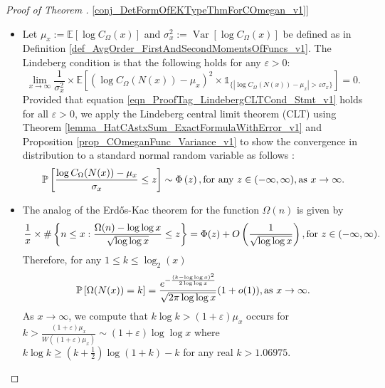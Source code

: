\documentclass[11pt,reqno,a4letter]{article}
\newcommand{\hlocalref}[1]{\hyperref[#1]{\ref{#1}}}
\numberwithin{equation}{section}
\numberwithin{figure}{section}
\numberwithin{table}{section}
\theoremstyle{plain}
\numberwithin{theorem}{section}
\theoremstyle{definition}
\theoremstyle{remark}
\newcommand{\mathtext}[1]{\text{\rm #1}}
\begin{document}
\begin{proof}[Proof of Theorem \hlocalref{conj_DetFormOfEKTypeThmForCOmegan_v1}]
\begin{itemize}
\[     \times \mathbb{P}\left[C_p^{(x)} \geq 2\right] = o\left(\mathbb{E}[\Theta_{N(x)}]\right). 
\]
Analogous bounds can be proved to relate the variance of these 
two random variables as $x \rightarrow \infty$. 
\item 
Let $\mu_x := \mathbb{E}\left[\log C_{\Omega}(x)\right]$ and 
$\sigma_x^2 := \operatorname{Var}\left[\log C_{\Omega}(x)\right]$ be defined as in 
Definition \hlocalref{def_AvgOrder_FirstAndSecondMomentsOfFuncs_v1}. 
The Lindeberg condition is that the following 
holds for any $\varepsilon > 0$: 
\begin{equation}
\label{eqn_ProofTag_LindebergCLTCond_Stmt_v1}
\lim_{x \rightarrow \infty} \frac{1}{\sigma_x^2} \times 
     \mathbb{E}\left[\left(\log C_{\Omega}(N(x)) - \mu_x\right)^2 
     \times 
     \mathds{1}_{\{\left\lvert \log C_{\Omega}(N(x)) - \mu_x \right\rvert > 
     \varepsilon \sigma_x\}}\right] = 0. 
\end{equation}
Provided that 
equation \eqref{eqn_ProofTag_LindebergCLTCond_Stmt_v1} holds for all $\varepsilon > 0$, 
we apply the Lindeberg central limit theorem (CLT) using 
Theorem \hlocalref{lemma_HatCAstxSum_ExactFormulaWithError_v1} and 
Proposition \hlocalref{prop_COmeganFunc_Variance_v1} to show the 
convergence in distribution to a standard normal random variable as follows 
\cite[\S 27]{BILLINGSLY-PROB-AND-MEASURE-BOOK}: 
\begin{equation}
\label{eqn_ProofTag_LindebergCLT_Conclusion_Stmt_v2}
\mathbb{P}\left[\frac{\log C_{\Omega}(N(x)) - \mu_x}{\sigma_x} \leq z\right] \sim 
	\Phi\left(z\right), \mathtext{ for any } z \in (-\infty, \infty), 
	\mathtext{ as } x \rightarrow \infty.
\end{equation}
\item 
The analog of the Erd\H{o}s-Kac theorem for the function $\Omega(n)$ is given by 
\cite[Thm.~7.21; \S 7.4]{MV} 
\[
\frac{1}{x} \times \#\left\{n \leq x: \frac{\Omega(n) - \log\log x}{\sqrt{\log\log x}} \leq z\right\} = 
     \Phi(z) + O\left(\frac{1}{\sqrt{\log\log x}}\right), \mathtext{ for } z \in (-\infty, \infty). 
\]
Therefore, for any $1 \leq k \leq \log_2(x)$ 
\[
\mathbb{P}\left[\Omega(N(x)) = k\right] = 
	\frac{e^{-\frac{(k-\log\log x)^2}{2\log\log x}}}{\sqrt{2\pi \log\log x}}(1 + o(1)), 
	\mathtext{ as } x \rightarrow \infty. 
\]
As $x \rightarrow \infty$, we compute that $k\log k > (1+\varepsilon) \mu_x$ occurs for 
$k > \frac{(1+\varepsilon) \mu_x}{W\left((1+\varepsilon) \mu_x\right)} \sim (1+\varepsilon) \log\log x$ 
where $k\log k \geq \left(k + \frac{1}{2}\right) \log(1+k) - k$ for any real $k > 1.06975$. 

\end{itemize}
\end{proof}
\end{document}
